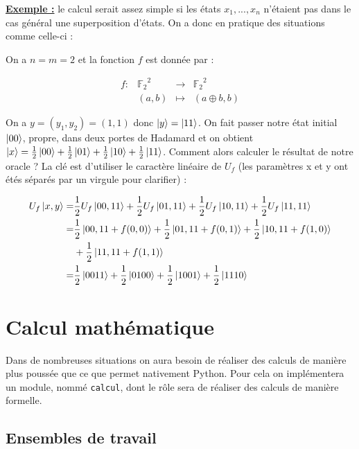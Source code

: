 \documentclass[french]{article}
\newcommand{\p}{\texttt} %
\newcommand{\exemple}{\textbf{\underline{Exemple :} }}
\newcommand{\fonction}[5]{\begin{array}{l|rcl}
#1: & #2 & \longrightarrow & #3 \\
    & #4 & \longmapsto & #5 \end{array}}
\begin{document}
\noindent \exemple le calcul serait assez simple si les états $x_1, ..., x_n$ n'étaient pas dans le cas général une superposition d'états. On a donc en pratique des situations comme celle-ci :

On a $n = m = 2$ et la fonction $f$ est donnée par :

$$\fonction{f}{{\mathbb{F}_2}^2}{{\mathbb{F}_2}^2}{(a, b)}{(a \oplus b, b)}$$

On a $y = (y_1, y_2) = (1, 1)$ donc $\ket y = \ket{11}$. On fait passer notre état initial $\ket{00}$, propre, dans deux portes de Hadamard et on obtient $\ket{x} = \frac{1}{2}\ket{00} + \frac{1}{2}\ket{01} + \frac{1}{2} \ket{10} + \frac{1}{2} \ket{11}$. Comment alors calculer le résultat de notre oracle ? La clé est d'utiliser le caractère linéaire de $U_f$ (les paramètres x et y ont étés séparés par un virgule pour clarifier) :

\begin{equation*}
\begin{split}
    U_f \ket{x, y} =& \frac{1}{2} U_f \ket{00,11} + \frac{1}{2} U_f \ket{01,11} + \frac{1}{2} U_f \ket{10,11} + \frac{1}{2} U_f \ket{11,11} \\
    =& \frac{1}{2} \ket{00,11 + f(0,0)} + \frac{1}{2} \ket{01, 11 + f(0,1)} + \frac{1}{2} \ket{10,11 + f(1,0)} \\
    & + \frac{1}{2} \ket{11, 11 + f(1,1)} \\
    =& \frac{1}{2} \ket{0011} + \frac{1}{2} \ket{0100} + \frac{1}{2} \ket{1001} + \frac{1}{2} \ket{1110}
\end{split}
\end{equation*}

\section{Calcul mathématique}


Dans de nombreuses situations on aura besoin de réaliser des calculs de manière plus poussée que ce que permet nativement Python. Pour cela on implémentera un module, nommé \p{calcul}, dont le rôle sera de réaliser des calculs de manière formelle.

\subsection{Ensembles de travail} \label{ensembles}
\end{document}
